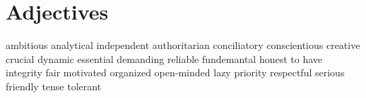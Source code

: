 \section{Adjectives}
   {ambitious}
   {analytical}
   {independent}
   {authoritarian}
   {conciliatory}
   {conscientious}
   {creative}
   {crucial}
   {dynamic}
   {essential}
   {demanding}
   {reliable}
   {fundemantal}
   {honest}
   {to have integrity}
   {fair}
   {motivated}
   {organized}
   {open-minded}
   {lazy}
   {priority}
   {respectful}
   {serious}
   {friendly}
   {tense}
   {tolerant}
